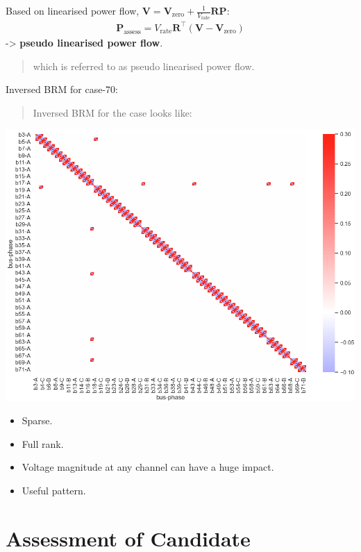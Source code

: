 \documentclass[
]{book}
\providecommand{\tightlist}{%
  \setlength{\itemsep}{0pt}\setlength{\parskip}{0pt}}
\begin{document}
Based on linearised power flow, \(\boldsymbol{V} = \boldsymbol{V}_\text{zero} + \frac{1}{V_\text{rate}} \boldsymbol{R} \boldsymbol{P}\):
\[ \begin{aligned}
    \boldsymbol{P}_\text{assess} =
    V_\text{rate} \boldsymbol{R}^{\top}
    \left( \boldsymbol{V} - \boldsymbol{V}_\text{zero} \right)
\end{aligned} \]
-\textgreater{} \textbf{pseudo linearised power flow}.

\begin{quote}
which is referred to as pseudo linearised power flow.
\end{quote}

Inversed BRM for case-70:

\begin{quote}
Inversed BRM for the case looks like:
\end{quote}

\begin{center}\includegraphics{Pictures/figHeatmapBrmInv} \end{center}

\begin{itemize}
\tightlist
\item
  Sparse.
\item
  Full rank.
\item
  Voltage magnitude at any channel can have a huge impact.
\item
  Useful pattern.
\end{itemize}

\hypertarget{assessment}{%
\section{Assessment of Candidate}\label{assessment}}
\end{document}
